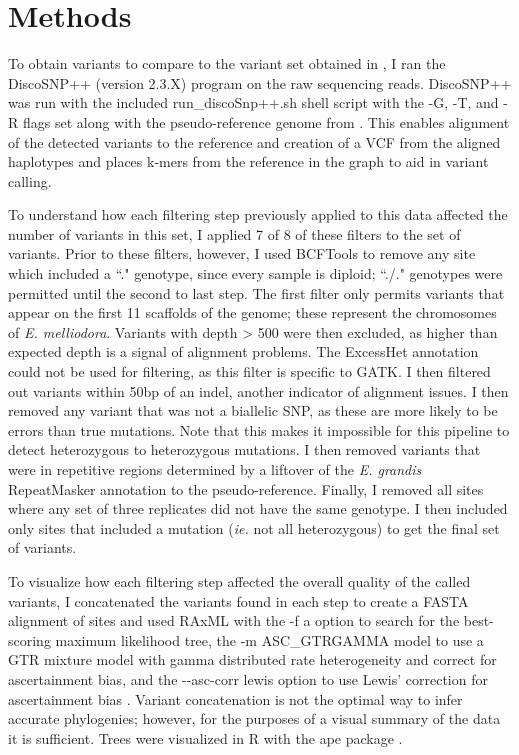 \section{Methods}

To obtain variants to compare to the variant set obtained in \textcite{orr_phylogenomic_2020}, I ran the DiscoSNP++ (version 2.3.X) program on the raw sequencing reads. DiscoSNP++ was run with the included run\_discoSnp++.sh shell script with the -G, -T, and -R flags set along with the pseudo-reference genome from \textcite{orr_phylogenomic_2020}. This enables alignment of the detected variants to the reference and creation of a VCF from the aligned haplotypes and places k-mers from the reference in the graph to aid in variant calling.

To understand how each filtering step previously applied to this data affected the number of variants in this set, I applied 7 of 8 of these filters to the set of variants. Prior to these filters, however, I used BCFTools \parencite{li_statistical_2011} to remove any site which included a ``." genotype, since every sample is diploid; ``./." genotypes were permitted until the second to last step. The first filter only permits variants that appear on the first 11 scaffolds of the genome; these represent the chromosomes of \textit{E. melliodora}. Variants with depth > 500 were then excluded, as higher than expected depth is a signal of alignment problems. The ExcessHet annotation could not be used for filtering, as this filter is specific to GATK. I then filtered out variants within 50bp of an indel, another indicator of alignment issues. I then removed any variant that was not a biallelic SNP, as these are more likely to be errors than true mutations. Note that this makes it impossible for this pipeline to detect heterozygous to heterozygous mutations. I then removed variants that were in repetitive regions determined by a liftover of the \textit{E. grandis} RepeatMasker annotation \parencite{bartholome_high-resolution_2015} to the pseudo-reference. Finally, I removed all sites where any set of three replicates did not have the same genotype. I then included only sites that included a mutation (\textit{ie.} not all heterozygous) to get the final set of variants.

To visualize how each filtering step affected the overall quality of the called variants, I concatenated the variants found in each step to create a FASTA alignment of sites and used RAxML \parencite{stamatakis_raxml_2014} with the -f a option to search for the best-scoring maximum likelihood tree, the -m ASC\_GTRGAMMA model to use a GTR mixture model with gamma distributed rate heterogeneity and correct for ascertainment bias, and the -\phantom{}-asc-corr lewis option to use Lewis' correction for ascertainment bias \parencite{lewis_likelihood_2001}. Variant concatenation is not the optimal way to infer accurate phylogenies; however, for the purposes of a visual summary of the data it is sufficient. Trees were visualized in R \parencite{r_core_2020} with the ape package \parencite{paradis_ape_2019}.

